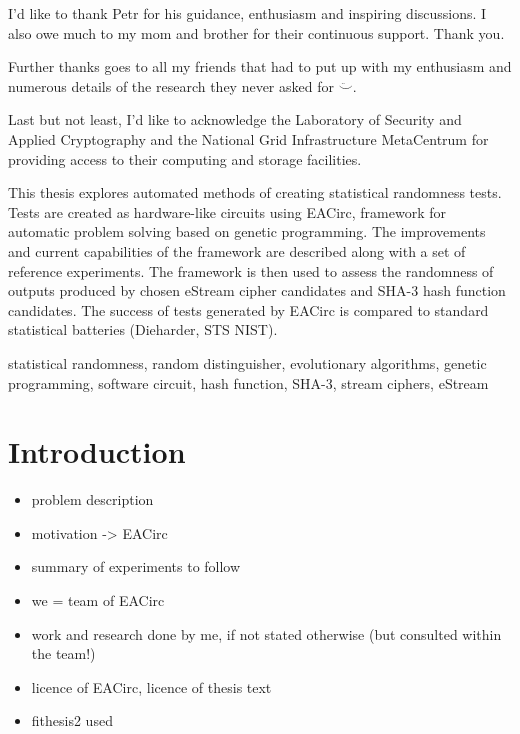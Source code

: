 \documentclass[12pt,oneside]{fithesis2}
\newcommand{\squarebullet}{\textcolor{black}{\raisebox{0.15em}{\rule{4pt}{4pt}}}}
\newenvironment{myItemize}{
  \begin{itemize}[leftmargin=2em,rightmargin=1em,itemsep=\parskip ,parsep=0em,topsep=0em,partopsep=0em]
  \renewcommand{\labelitemi}{\squarebullet}
  \renewcommand{\labelitemii}{$\diamond$}
}{
  \end{itemize}
}
\begin{document}
\FrontMatter
\ThesisTitlePage

\begin{ThesisDeclaration}
\DeclarationText
\AdvisorName
\end{ThesisDeclaration}

\begin{ThesisThanks}
I'd like to thank Petr for his guidance, enthusiasm and inspiring discussions.
I also owe much to my mom and brother for their continuous support. Thank you.

\noindent
Further thanks goes to all my friends that had to put up with my enthusiasm 
and numerous details of the research they never asked for $\ddot\smile$.

\noindent
Last but not least, I'd like to acknowledge the Laboratory of Security and Applied Cryptography and 
the National Grid Infrastructure MetaCentrum for providing access to their computing and storage facilities.
\end{ThesisThanks}

\begin{ThesisAbstract}
This thesis explores automated methods of creating statistical randomness tests. Tests are created as hardware-like circuits using
EACirc, framework for automatic problem solving based on genetic programming. The improvements and current capabilities
of the framework are described along with a set of reference experiments.
The framework is then used to assess the randomness of outputs produced by chosen eStream cipher candidates
and SHA-3 hash function candidates.
The success of tests generated by EACirc is compared to standard statistical batteries (Dieharder, STS NIST).
\end{ThesisAbstract}

\begin{ThesisKeyWords}
statistical randomness, random distinguisher, evolutionary algorithms, genetic programming, software circuit, 
hash function, SHA-3, stream ciphers, eStream
\end{ThesisKeyWords}

\MainMatter
\tableofcontents
\chapter{Introduction}
\label{chap:intro}



\begin{myItemize}
\item problem description
\item motivation -> EACirc
\item summary of experiments to follow
\item we = team of EACirc
\item work and research done by me, if not stated otherwise (but consulted within the team!)
\item licence of EACirc, licence of thesis text
\item fithesis2 used
\end{myItemize}
\end{document}
